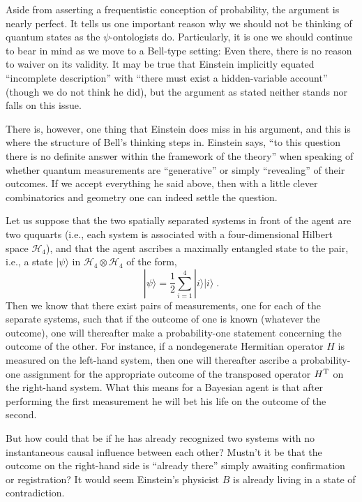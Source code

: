 \documentclass[aps,pra,superscriptaddress,12pt,tightenlines,nofootinbib]{revtex4-2}
\begin{document}
Aside from asserting a frequentistic conception of probability, the argument is nearly perfect.  It tells us one important reason why we should not be thinking of quantum states as the $\psi$-ontologists do.  Particularly, it is one we should continue to bear in mind as we move to a Bell-type setting:  Even there, there is no reason to waiver on its validity.  It may be true that Einstein implicitly equated ``incomplete description'' with ``there must exist a hidden-variable account'' (though we do not think he did), but the argument as stated neither stands nor falls on this issue.

There is, however, one thing that Einstein does miss in his argument, and this is where the structure of Bell's thinking steps in.  Einstein says, ``to this question there is no definite answer within the framework of the theory'' when speaking of whether quantum measurements are ``generative'' or simply ``revealing'' of their outcomes.  If we accept everything he said above, then with a little clever combinatorics and geometry one can indeed settle the question.

Let us suppose that the two spatially separated systems in front of the agent are two ququarts (i.e., each system is associated with a four-dimensional Hilbert space ${\mathcal H}_4$), and that the agent ascribes a maximally entangled state to the pair, i.e., a state $|\psi\rangle$ in ${\mathcal H}_4\otimes{\mathcal H}_4$ of the form,
\begin{equation}
|\psi\rangle=\frac{1}{2}\sum_{i=1}^4|i\rangle|i\rangle\;.
\end{equation}
Then we know that there exist pairs of measurements, one for each of the separate systems, such that if the outcome of one is known (whatever the outcome), one will thereafter make a probability-one statement concerning the outcome of the other.  For instance, if a nondegenerate Hermitian operator $H$ is measured on the left-hand system, then one will thereafter ascribe a probability-one assignment for the appropriate outcome of the transposed operator $H^{\rm T}$ on the right-hand system.  What this means for a Bayesian agent is that after performing the first measurement he will bet his life on the outcome of the second.

But how could that be if he has already recognized two systems with no instantaneous causal influence between each other?  Mustn't it be that the outcome on the right-hand side is ``already there'' simply awaiting confirmation or registration?  It would seem Einstein's physicist $B$ is already living in a state of contradiction.
\end{document}
